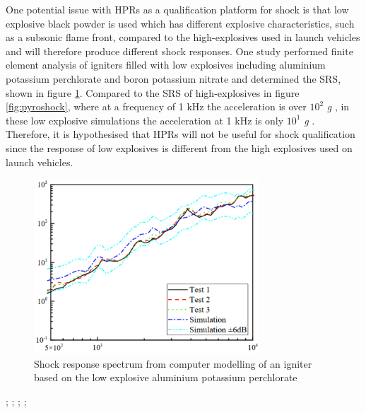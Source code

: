 \documentclass[a4paper,11pt]{article}
\begin{document}
One potential issue with HPRs as a qualification platform for shock is that low explosive black powder is used \cite{canepa2005modern} which has different explosive characteristics, such as a subsonic flame front, compared to the high-explosives used in launch vehicles \cite{bement1995manual} and will therefore produce different shock responses. One study \cite{wang2023numerical} performed finite element analysis of igniters filled with low explosives including aluminium potassium perchlorate and boron potassium nitrate and determined the SRS, shown in figure \ref{fig:lowsrs}. Compared to the SRS of high-explosives in figure \ref{fig:pyroshock}, where at a frequency of 1 kHz the acceleration is over $10^2$ \textit{g} \cite{nasa-pyroshock}, in these low explosive simulations the acceleration at 1 kHz is only $10^1$ \textit{g} \cite{wang2023numerical}. Therefore, it is hypothesised that HPRs will not be useful for shock qualification since the response of low explosives is different from the high explosives used on launch vehicles.


\begin{figure}[H]
  \centering
  \includegraphics[width=0.75\textwidth]{images/deflagration.png}
  \caption{Shock response spectrum from computer modelling of an igniter based on the low explosive aluminium potassium perchlorate \cite{wang2023numerical}}
  \label{fig:lowsrs}
\end{figure}

;
;
;
;
\end{document}

